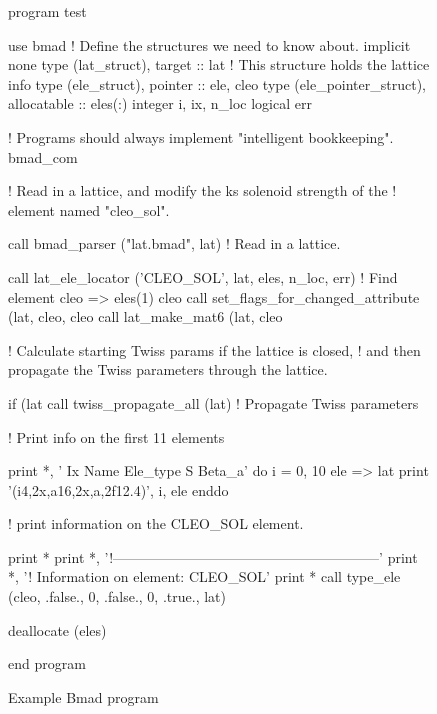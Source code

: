 \begin{figure}[htp]
\begin{listing}{1}
program test

use bmad                 ! Define the structures we need to know about.
implicit none
type (lat_struct), target :: lat   ! This structure holds the lattice info
type (ele_struct), pointer :: ele, cleo
type (ele_pointer_struct), allocatable :: eles(:)
integer i, ix, n_loc
logical err

! Programs should always implement "intelligent bookkeeping".
bmad_com%

! Read in a lattice, and modify the ks solenoid strength of the 
! element named "cleo_sol".

call bmad_parser ("lat.bmad", lat)  ! Read in a lattice.

call lat_ele_locator ('CLEO_SOL', lat, eles, n_loc, err)  ! Find element
cleo => eles(1)%
cleo%
call set_flags_for_changed_attribute (lat, cleo, cleo%
call lat_make_mat6 (lat, cleo%

! Calculate starting Twiss params if the lattice is closed, 
! and then propagate the Twiss parameters through the lattice.

if (lat%
call twiss_propagate_all (lat)      ! Propagate Twiss parameters

! Print info on the first 11 elements

print *, ' Ix  Name              Ele_type                   S      Beta_a'
do i = 0, 10
  ele => lat%
  print '(i4,2x,a16,2x,a,2f12.4)', i, ele%
enddo

! print information on the CLEO_SOL element.

print *
print *, '!---------------------------------------------------------'
print *, '! Information on element: CLEO_SOL'
print *
call type_ele (cleo, .false., 0, .false., 0, .true., lat)

deallocate (eles)

end program
\end{listing}
\caption{Example Bmad program}
\label{f:program}
\end{figure}

